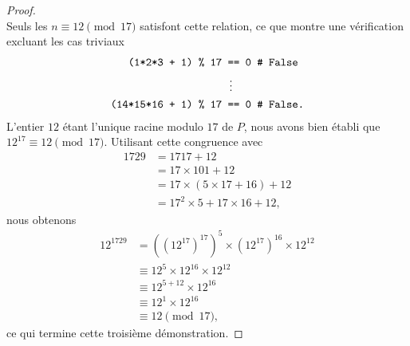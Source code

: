 \begin{proof}
\begin{equation}
\end{equation}
%
Seuls les $n \equiv 12 \pmod{17}$ satisfont cette relation, ce que montre une vérification excluant les cas triviaux
%
\begin{align}
  \text{\texttt{(1*2*3 + 1) \% 17 }}&\text{\texttt{== 0    \# False}}\\
  &\hspace{0.14em}\vdots \nonumber\\
  \text{\texttt{(14*15*16 + 1) \% 17 }}&\text{\texttt{== 0    \# False.}}
\end{align}
%
L'entier $12$ étant l'unique racine modulo $17$ de $P$, nous avons bien établi que $12^{17} \equiv 12 \pmod{17}$. Utilisant %
cette congruence avec 
%
\begin{align}
  1729 &= 1717 + 12 \\
  &= 17 \times 101  + 12 \\
  &= 17 \times (5 \times 17 + 16) + 12 \\
  &= 17^2 \times 5 + 17 \times 16 + 12, 
\end{align}
%
nous obtenons 
%
\begin{align}
  12^{1729} &= ((12^{17})^{17})^5 \times (12^{17})^{16} \times 12^{12} \\
  &\equiv 12^5 \times 12^{16} \times 12^{12} \\
  &\equiv 12^{5+12} \times 12^{16} \\
  &\equiv 12^1 \times 12^{16} \\
  &\equiv 12 \pmod{17},
\end{align}
%
ce qui termine cette troisième démonstration.
%

\end{proof}
